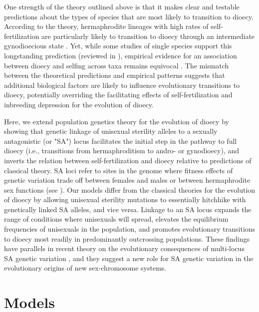 \documentclass{article}
\begin{document}
One strength of the theory outlined above is that it makes clear and testable predictions about the types of species that are most likely to transition to dioecy. According to the theory, hermaphrodite lineages with high rates of self-fertilization are particularly likely to transition to dioecy through an intermediate gynodioecious state \citep{Charlesworth1978a, Charlesworth1999, KaferPannell2017}. Yet, while some studies of single species support this longstanding prediction (reviewed in \citealt{Webb1999, DufayBillard2012}), empirical evidence for an association between dioecy and selfing across taxa remains equivocal \citep{Charlesworth1985, Charlesworth2006, Renner2014}. The mismatch between the theoretical predictions and empirical patterns suggests that additional biological factors are likely to influence evolutionary transitions to dioecy, potentially overriding the facilitating effects of self-fertilization and inbreeding depression for the evolution of dioecy.

Here, we extend population genetics theory for the evolution of dioecy by showing that genetic linkage of unisexual sterility alleles to a sexually antagonistic (or "SA") locus facilitates the initial step in the pathway to full dioecy (i.e., transitions from hermaphroditism to andro- or gynodioecy), and inverts the relation between self-fertilization and dioecy relative to predictions of classical theory. SA loci refer to sites in the genome where fitness effects of genetic variation trade off between females and males or between hermaphrodite sex functions (see \citealt{Gregorious1982, Morgan1992a, Morgan1992b, JordanConnallon2014, Olito2017}). Our models differ from the classical theories for the evolution of dioecy \citep{Charlesworth1978a} by allowing unisexual sterility mutations to essentially hitchhike with genetically linked SA alleles, and vice versa. Linkage to an SA locus expands the range of conditions where unisexuals will spread, elevates the equilibrium frequencies of unisexuals in the population, and promotes evolutionary transitions to dioecy most readily in predominantly outcrossing populations. These findings have parallels in recent theory on the evolutionary consequences of multi-locus SA genetic variation \citep{ConnallonClark2010, Patten2010, UbedaPatten2010, ConnallonJordan2016, Olito2017}, and they suggest a new role for SA genetic variation in the evolutionary origins of new sex-chromosome systems.



\section*{Models} \label{sec:Models}
\end{document}
